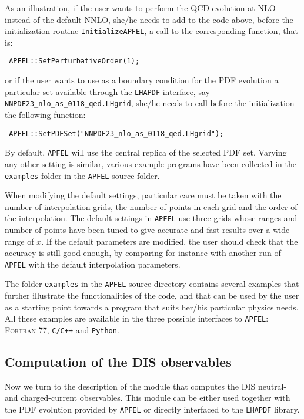 \documentclass[11pt,a4paper]{article}
\begin{document}
As an illustration, if the user wants to perform the QCD evolution at NLO
instead of  the default NNLO, she/he needs to add to the code above,
before the initialization routine {\tt InitializeAPFEL}, a call to the
corresponding function, that is:
\begin{lstlisting}
 APFEL::SetPerturbativeOrder(1);
\end{lstlisting}
or if the user wants to use as a boundary condition for the PDF
evolution a particular set available through the {\tt LHAPDF} interface, say
{\tt NNPDF23\_nlo\_as\_0118\_qed.LHgrid}, she/he needs
to call before the initialization the following function:
\begin{lstlisting}
 APFEL::SetPDFSet("NNPDF23_nlo_as_0118_qed.LHgrid");
\end{lstlisting}
By default, {\tt APFEL} will use the central replica of
the selected PDF set. 
%
Varying any other setting is similar, various example programs
have been collected in the {\tt examples} folder in the {\tt APFEL} source
folder.
%

When modifying the default settings, particular care 
must be taken with the number of interpolation grids, the number
of points in each grid and the order of the interpolation.
%
The  default
settings in {\tt APFEL} use three grids whose ranges and
number of points have been tuned to give accurate and
fast results over a wide range of $x$.
%
If the default parameters are modified, the user should check
that the accuracy is still good enough, by comparing for instance
with another run of {\tt APFEL} with the default interpolation
parameters.

The folder {\tt examples} in the {\tt APFEL} source directory contains
several examples that further illustrate the functionalities of
the code, and that can be used by the user as a starting point
towards a program that suits her/his particular physics needs.
%
All these examples are available in the three possible interfaces to
{\tt APFEL}: {\scshape Fortran 77}, {\tt C/C++} and {\tt Python}.


\subsection{Computation of the DIS observables}

Now we turn to the description of the module that computes the DIS
neutral- and charged-current observables. 
%
This module can be either used together with the PDF
evolution provided by {\tt APFEL} or directly interfaced to the
 {\tt LHAPDF} library.
\end{document}
